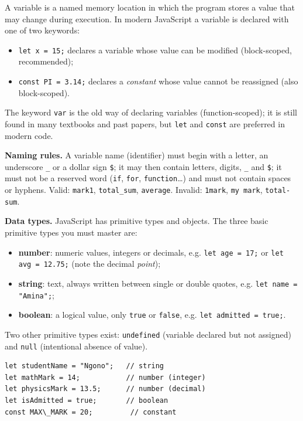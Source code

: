 \documentclass[11pt]{article}
\newcommand{\cle}[1]{{\popxbold\color{popdark}#1}}
\newcounter{popsec}
\newcounter{popsub}
\newcommand{\courssub}[1]{%
  \stepcounter{popsub}%
  \par\vspace{9pt}\noindent{\popxbold\fontsize{11.5}{13}\selectfont\color{popink}{\color{poporange}\thepopsec.\thepopsub}\hspace{6pt}#1}\par\nopagebreak\vspace{4pt}
}
\begin{document}
\courssub{Variables and Data Types}

A \cle{variable} is a named memory location in which the program stores a value that may change during execution. In modern JavaScript a variable is declared with one of two keywords:
\begin{itemize}
\item \texttt{let x = 15;} declares a variable whose value can be modified (block-scoped, recommended);
\item \texttt{const PI = 3.14;} declares a \emph{constant} whose value cannot be reassigned (also block-scoped).
\end{itemize}
The keyword \texttt{var} is the old way of declaring variables (function-scoped); it is still found in many textbooks and past papers, but \texttt{let} and \texttt{const} are preferred in modern code.

\textbf{Naming rules.} A variable name (identifier) must begin with a letter, an underscore \texttt{\_} or a dollar sign \texttt{\$}; it may then contain letters, digits, \texttt{\_} and \texttt{\$}; it must not be a reserved word (\texttt{if}, \texttt{for}, \texttt{function}\ldots) and must not contain spaces or hyphens. Valid: \texttt{mark1}, \texttt{total\_sum}, \texttt{average}. Invalid: \texttt{1mark}, \texttt{my mark}, \texttt{total-sum}.

\textbf{Data types.} JavaScript has primitive types and objects. The three basic primitive types you must master are:
\begin{itemize}
\item \textbf{number}: numeric values, integers or decimals, e.g. \texttt{let age = 17;} or \texttt{let avg = 12.75;} (note the decimal \emph{point});
\item \textbf{string}: text, always written between single or double quotes, e.g. \texttt{let name = "Amina";};
\item \textbf{boolean}: a logical value, only \texttt{true} or \texttt{false}, e.g. \texttt{let admitted = true;}.
\end{itemize}
Two other primitive types exist: \texttt{undefined} (variable declared but not assigned) and \texttt{null} (intentional absence of value).

\begin{exemplebox}
\begin{verbatim}
let studentName = "Ngono";   // string
let mathMark = 14;           // number (integer)
let physicsMark = 13.5;      // number (decimal)
let isAdmitted = true;       // boolean
const MAX\_MARK = 20;         // constant
\end{verbatim}
\end{exemplebox}
\end{document}
